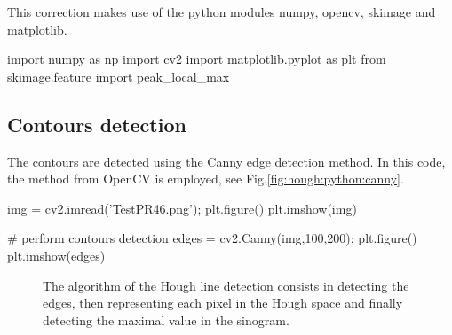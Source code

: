 \def\QRCODE{TB_IPR_TUT.IMG.hough_pythonqrcode.png}
\def\QRPAGE{http://www.iptutorials.science/tree/master/TB_IPR/TUT.IMG.hough/python}

This correction makes use of the python modules numpy, opencv, skimage and matplotlib.
\begin{python}
import numpy as np
import cv2
import matplotlib.pyplot as plt
from skimage.feature import peak_local_max
\end{python}

\subsection{Contours detection}
The contours are detected using the Canny edge detection method. In this code, the method from OpenCV is employed, see Fig.\ref{fig:hough:python:canny}.

\begin{python}
img = cv2.imread('TestPR46.png');
plt.figure()
plt.imshow(img)

# perform contours detection
edges = cv2.Canny(img,100,200);
plt.figure()
plt.imshow(edges)
\end{python}

\begin{figure}[htbp]
 \centering
 \hfill 
 
 \caption{The algorithm of the Hough line detection consists in detecting the edges, then representing each pixel in the Hough space and finally detecting the maximal value in the sinogram.}
 \label{fig:hough:python:algo}
\end{figure}


